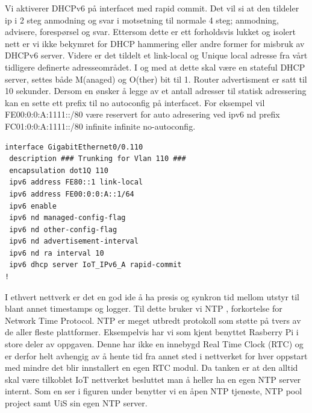 \documentclass{article}
\begin{document}
Vi aktiverer DHCPv6 på interfacet med rapid commit. Det vil si at den tildeler ip i 2 steg anmodning og svar i motsetning til normale 4 steg; anmodning, advisere,  forespørsel og svar. Ettersom dette er ett forholdsvis lukket og isolert nett er vi ikke bekymret for DHCP hammering eller andre former for misbruk av DHCPv6 server. Videre er det tildelt et link-local og Unique local adresse fra vårt tidligere definerte adresseområdet. I og med at dette skal være en stateful DHCP server, settes både M(anaged) og O(ther) bit til 1. Router advertisment er satt til 10 sekunder. Dersom en ønsker å legge av et antall adresser til statisk adressering kan en sette ett prefix til no autoconfig på interfacet. For eksempel vil FE00:0:0:A:1111::/80 være reservert for auto adresering ved ipv6 nd prefix FC01:0:0:A:1111::/80 infinite infinite no-autoconfig. 


\lstset{breaklines=true}
\begin{verbatim}
interface GigabitEthernet0/0.110
 description ### Trunking for Vlan 110 ###
 encapsulation dot1Q 110
 ipv6 address FE80::1 link-local
 ipv6 address FE00:0:0:A::1/64
 ipv6 enable
 ipv6 nd managed-config-flag
 ipv6 nd other-config-flag
 ipv6 nd advertisement-interval
 ipv6 nd ra interval 10
 ipv6 dhcp server IoT_IPv6_A rapid-commit
!
\end{verbatim}
\lstset{breaklines=true}

I ethvert nettverk er det en god ide å ha presis og synkron tid mellom utstyr til blant annet timestamps og logger. Til dette bruker vi NTP \cite{ntpwebsite}, forkortelse for Network Time Protocol. NTP er meget utbredt protokoll som støtte på tvers av de aller fleste plattformer. Eksempelvis har vi som kjent benyttet Rasberry Pi i store deler av oppgaven.  Denne har ikke en innebygd Real Time Clock (RTC) og er derfor helt avhengig av å hente tid fra annet sted i nettverket for hver oppstart med mindre det blir innstallert en egen RTC modul. Da tanken er at den alltid skal være tilkoblet IoT nettverket besluttet man  å heller ha en egen NTP server internt. Som en ser i figuren under benytter vi en åpen NTP tjeneste, NTP pool project samt UiS sin egen NTP server. 
\end{document}
